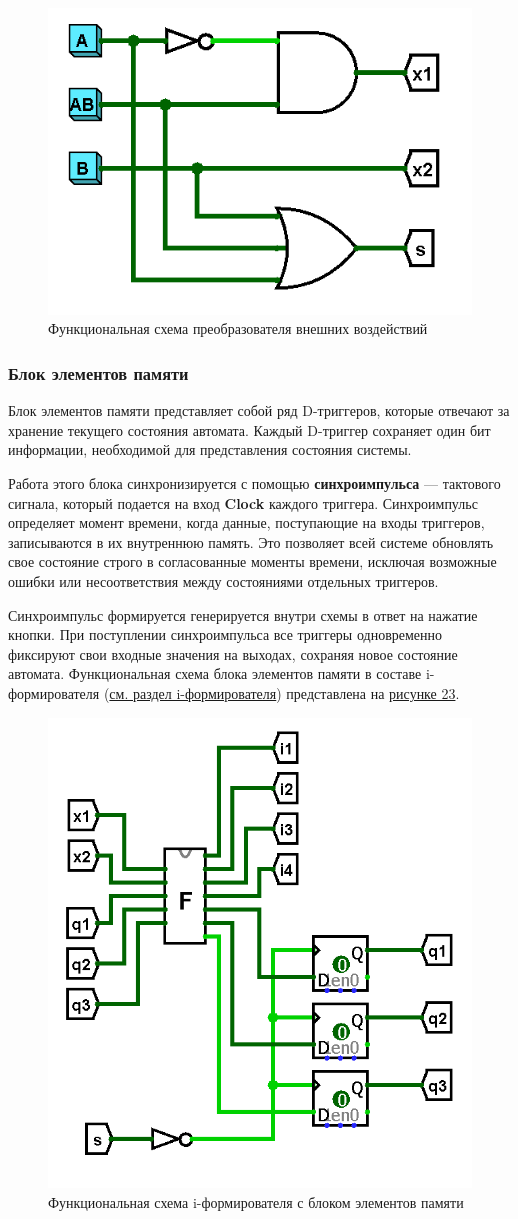 \documentclass[11pt,a4paper,final]{article} %
\begin{document}
\begin{figure}[H]
	\centering
	\includegraphics[width=0.45 \linewidth]{img/input-converter.png}
	\caption{Функциональная схема преобразователя внешних воздействий}
	\label{fig:influence}
\end{figure}


\subsubsection{Блок элементов памяти}

Блок элементов памяти представляет собой ряд D-триггеров, которые отвечают за хранение текущего состояния автомата. Каждый D-триггер сохраняет один бит информации, необходимой для представления состояния системы. 

Работа этого блока синхронизируется с помощью \textbf{синхроимпульса} — тактового сигнала, который подается на вход \textbf{Clock} каждого триггера. Синхроимпульс определяет момент времени, когда данные, поступающие на входы триггеров, записываются в их внутреннюю память. Это позволяет всей системе обновлять свое состояние строго в согласованные моменты времени, исключая возможные ошибки или несоответствия между состояниями отдельных триггеров.

Синхроимпульс формируется генерируется внутри схемы в ответ на нажатие кнопки. При поступлении синхроимпульса все триггеры одновременно фиксируют свои входные значения на выходах, сохраняя новое состояние автомата. Функциональная схема блока элементов памяти в составе i-формирователя (\hyperref[sec:i]{см. раздел i-формирователя}) представлена на \hyperref[fig:icov]{рисунке 23}.

\begin{figure}[H]
	\centering
	\includegraphics[width=0.65 \linewidth]{img/i-converter.png}
	\caption{Функциональная схема i-формирователя с блоком элементов памяти}
	\label{fig:icov}
\end{figure}
\end{document}
